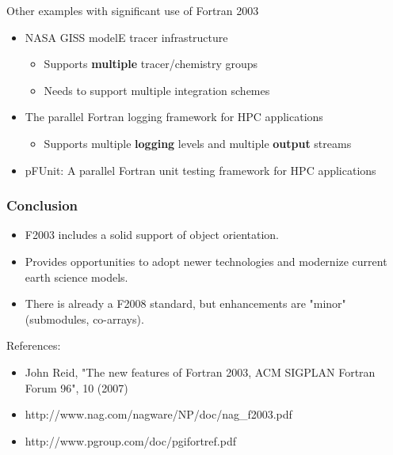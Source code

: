 \documentclass[11pt]{beamer}
\newcommand\FontCcolumn{\fontsize{10}{7.2}\selectfont}
\begin{document}

\begin{frame}{Other examples with significant use of Fortran 2003}

\begin{itemize}

  \item NASA GISS modelE tracer infrastructure 
  \begin{itemize}
  \item Supports \textbf{multiple} tracer/chemistry groups
  \item Needs to support multiple integration schemes
  \end{itemize}

  \item The parallel Fortran logging framework for HPC applications 
  \begin{itemize}
  \item Supports multiple \textbf{logging} levels and multiple \textbf{output} streams
  \end{itemize}
  
  \item pFUnit: A parallel Fortran unit testing framework for HPC applications
  
 \end{itemize}

\end{frame}


\begin{frame}[fragile]
\frametitle{Conclusion}

\FontCcolumn

\begin{itemize}
\item F2003 includes a solid support of object orientation.
\item Provides opportunities to adopt newer technologies and modernize current earth science models.
\item There is already a F2008 standard, but enhancements are "minor" (submodules, co-arrays).
\end{itemize}

\bigskip
References:
\begin{itemize}
\item John Reid, "The new features of Fortran 2003, ACM SIGPLAN Fortran Forum 96", 10 (2007)
\item http://www.nag.com/nagware/NP/doc/nag\_f2003.pdf
\item http://www.pgroup.com/doc/pgifortref.pdf
\end{itemize}
\end{frame}
\end{document}
